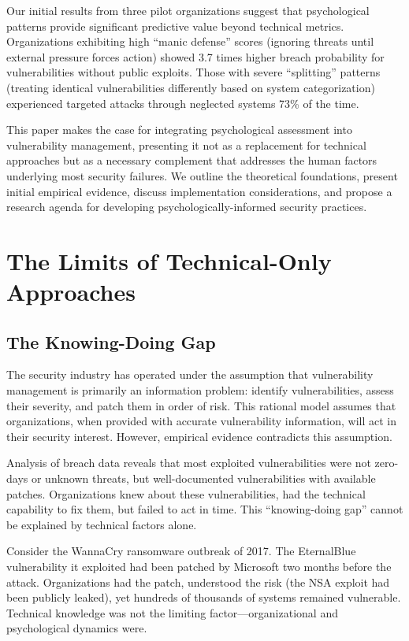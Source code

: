 \documentclass[11pt,a4paper]{article}
\begin{document}
Our initial results from three pilot organizations suggest that psychological patterns provide significant predictive value beyond technical metrics. Organizations exhibiting high ``manic defense'' scores (ignoring threats until external pressure forces action) showed 3.7 times higher breach probability for vulnerabilities without public exploits. Those with severe ``splitting'' patterns (treating identical vulnerabilities differently based on system categorization) experienced targeted attacks through neglected systems 73\% of the time.

This paper makes the case for integrating psychological assessment into vulnerability management, presenting it not as a replacement for technical approaches but as a necessary complement that addresses the human factors underlying most security failures. We outline the theoretical foundations, present initial empirical evidence, discuss implementation considerations, and propose a research agenda for developing psychologically-informed security practices.

\section{The Limits of Technical-Only Approaches}

\subsection{The Knowing-Doing Gap}

The security industry has operated under the assumption that vulnerability management is primarily an information problem: identify vulnerabilities, assess their severity, and patch them in order of risk. This rational model assumes that organizations, when provided with accurate vulnerability information, will act in their security interest. However, empirical evidence contradicts this assumption.

Analysis of breach data reveals that most exploited vulnerabilities were not zero-days or unknown threats, but well-documented vulnerabilities with available patches\cite{ransomware2023}. Organizations knew about these vulnerabilities, had the technical capability to fix them, but failed to act in time. This ``knowing-doing gap'' cannot be explained by technical factors alone.

Consider the WannaCry ransomware outbreak of 2017. The EternalBlue vulnerability it exploited had been patched by Microsoft two months before the attack. Organizations had the patch, understood the risk (the NSA exploit had been publicly leaked), yet hundreds of thousands of systems remained vulnerable. Technical knowledge was not the limiting factor—organizational and psychological dynamics were.
\end{document}
